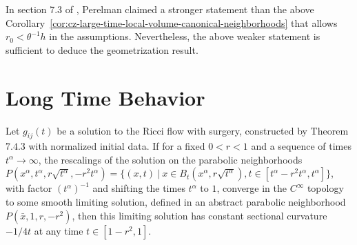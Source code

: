 \begin{remark}
  \label{rem:cz-large-time-canonical-neighborhood-scope}

In section 7.3 of \cite{P2}, Perelman claimed a stronger statement
than the above Corollary~\ref{cor:cz-large-time-local-volume-canonical-neighborhoods} that allows $r_0 < \theta^{-1}h$ in
the assumptions. Nevertheless, the above weaker statement is
sufficient to deduce the geometrization result.
\end{remark}
\section{Long Time Behavior}
\begin{lemma}
  \label{lem:cz-parabolic-blowdown-flatness}

Let $g_{ij}(t)$ be a solution to the Ricci flow with surgery,
constructed by Theorem $7.4.3$ with normalized initial data. If for
a fixed $0<r<1$ and a sequence of times
$t^{\alpha}\rightarrow\infty$, the rescalings of the solution on the
parabolic neighborhoods
$P(x^{\alpha},t^{\alpha},r\sqrt{t^{\alpha}},-r^2t^{\alpha})=\{(x,t)\
|\ x\in B_t(x^{\alpha},r\sqrt{t^{\alpha}}),
t\in[t^{\alpha}-r^2t^{\alpha},t^{\alpha}]\}$, with factor
$(t^{\alpha})^{-1}$ and shifting the times $t^{\alpha}$ to $1$,
converge in the $C^{\infty}$ topology to some smooth limiting
solution, defined in an abstract parabolic neighborhood
$P(\bar{x},1,r,-r^2)$, then this limiting solution has constant
sectional curvature $-1/4t$ at any time $t\in [1-r^2,1]$.
\end{lemma}
